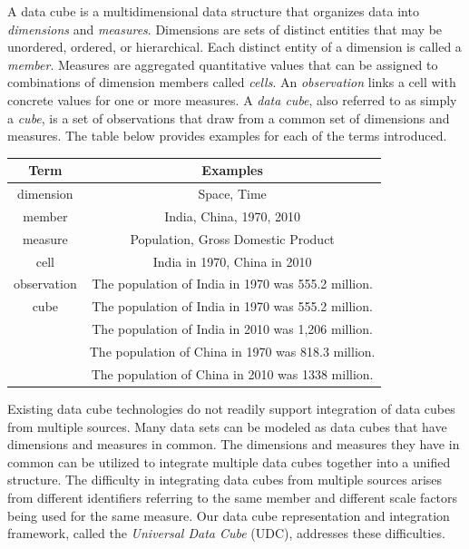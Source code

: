 A data cube is a multidimensional data structure that organizes data into \emph{dimensions} and \emph{measures}. Dimensions are sets of distinct entities that may be unordered, ordered, or hierarchical. Each distinct entity of a dimension is called a \emph{member}. Measures are aggregated quantitative values that can be assigned to combinations of dimension members called \emph{cells}. An \emph{observation} links a cell with concrete values for one or more measures. A \emph{data cube}, also referred to as simply a \emph{cube}, is a set of observations that draw from a common set of dimensions and measures. The table below provides examples for each of the terms introduced.

\begin{center}
  \begin{tabular}{ | c | c | }
    \hline
    \textbf{Term} & \textbf{Examples} \\ \hline
    dimension & Space, Time \\ \hline
    member & India, China, 1970, 2010 \\ \hline
    measure & Population, Gross Domestic Product\\ \hline
    cell & India in 1970, China in 2010 \\ \hline
    observation & The population of India in 1970 was 555.2 million. \\ \hline
    cube & The population of India in 1970 was 555.2 million. \\
         & The population of India in 2010 was 1,206 million. \\
         & The population of China in 1970 was 818.3 million. \\
         & The population of China in 2010 was 1338 million. \\ \hline
  \end{tabular}
\end{center}

Existing data cube technologies do not readily support integration of data cubes from multiple sources. Many data sets can be modeled as data cubes that have dimensions and measures in common. The dimensions and measures they have in common can be utilized to integrate multiple data cubes together into a unified structure. The difficulty in integrating data cubes from multiple sources arises from different identifiers referring to the same member and different scale factors being used for the same measure. Our data cube representation and integration framework, called the \emph{Universal Data Cube} (UDC), addresses these difficulties.

